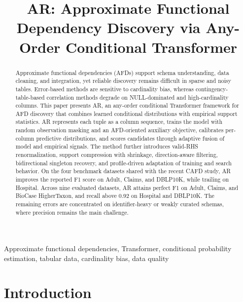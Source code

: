 \documentclass[conference]{IEEEtran}
\begin{document}
\title{AR: Approximate Functional Dependency Discovery via Any-Order Conditional Transformer}

\author{
}

\maketitle

\begin{abstract}
Approximate functional dependencies (AFDs) support schema understanding, data cleaning, and integration, yet reliable discovery remains difficult in sparse and noisy tables. Error-based methods are sensitive to cardinality bias, whereas contingency-table-based correlation methods degrade on NULL-dominated and high-cardinality columns. This paper presents AR, an any-order conditional Transformer framework for AFD discovery that combines learned conditional distributions with empirical support statistics. AR represents each tuple as a column sequence, trains the model with random observation masking and an AFD-oriented auxiliary objective, calibrates per-column predictive distributions, and scores candidates through adaptive fusion of model and empirical signals. The method further introduces valid-RHS renormalization, support compression with shrinkage, direction-aware filtering, bidirectional singleton recovery, and profile-driven adaptation of training and search behavior. On the four benchmark datasets shared with the recent CAFD study, AR improves the reported F1 score on Adult, Claims, and DBLP10K, while trailing on Hospital. Across nine evaluated datasets, AR attains perfect F1 on Adult, Claims, and BioCase HigherTaxon, and recall above 0.92 on Hospital and DBLP10K. The remaining errors are concentrated on identifier-heavy or weakly curated schemas, where precision remains the main challenge.
\end{abstract}

\begin{IEEEkeywords}
Approximate functional dependencies, Transformer, conditional probability estimation, tabular data, cardinality bias, data quality
\end{IEEEkeywords}

\section{Introduction}\label{sec:intro}
\end{document}
